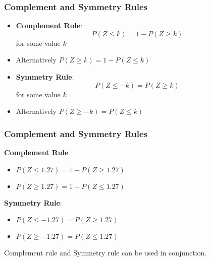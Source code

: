 \documentclass[a4]{beamer}
\begin{document}
\begin{frame}
\frametitle{Complement and Symmetry Rules}
\begin{itemize}
\item \textbf{Complement Rule}: \[ P(Z \leq k) = 1-P(Z \geq k) \] for some value $k$
\item Alternatively $ P(Z \geq k) = 1-P(Z \leq k) $
\item \textbf{Symmetry Rule}: \[ P(Z \leq -k) = P(Z \geq k) \] for some value $k$
\item Alternatively $ P(Z \geq -k) = P(Z \leq k) $
\end{itemize}
\end{frame}

\begin{frame}
\frametitle{Complement and Symmetry Rules}
\textbf{Complement Rule}

\begin{itemize}
\item $P(Z \leq 1.27) = 1-P(Z \geq 1.27) $
\item $ P(Z \geq 1.27) = 1-P(Z \leq 1.27) $
\end{itemize}

\bigskip
\textbf{Symmetry Rule}:
\begin{itemize}
\item $ P(Z \leq -1.27) = P(Z \geq 1.27) $
\item $ P(Z \geq -1.27) = P(Z \leq 1.27) $
\end{itemize}

Complement rule and Symmetry rule can be used in conjunction.
\end{frame}
\end{document}
